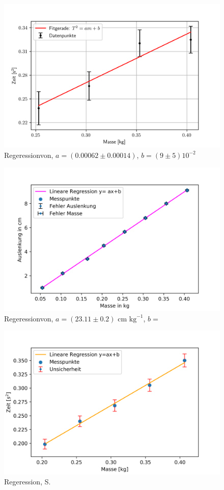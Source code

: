 	\newpage
		\begin{figure}[!ht]
		\centering								 
		\includegraphics[width=350pt]{fotos/gpr1/B_Reg_A2.png}			 
		\caption{Regeressionvon, $ a=(0.00062\pm 0.00014) $, $ b=(9\pm 5)10^{-2} $ }							 
		\label{Abb: Reg Ben A2}							 
	\end{figure}
		\begin{figure}[!ht]
		\centering								 
		\includegraphics[width=350pt]{fotos/gpr1/S_Reg_A1.png}			 
		\caption{Regeressionvon, $ a=(23.11\pm 0.2)\text{ cm kg}^{-1} $, $ b= $}							 
		\label{Abb: Reg Sara A1}							 
	\end{figure}
	\newpage
		\begin{figure}[!ht]
		\centering								 
		\includegraphics[width=350pt]{fotos/gpr1/S_Reg_A2.png}			 
		\caption{Regeression, S. }							 
		\label{Abb: Reg Sara A2}							 
	\end{figure}
